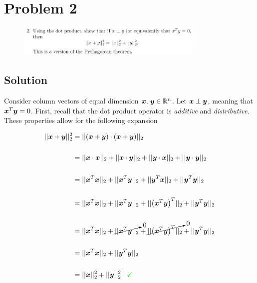 
\begingroup
\allowdisplaybreaks

\newpage
\section*{Problem 2}

\begin{figure}[h]
	\centering
	\includegraphics[width=0.8\textwidth]{./images/prob2_statement.png}
\end{figure}

\subsection*{Solution}

Consider column vectors of equal dimension $\boldsymbol{x},\,\boldsymbol{y} \in \mathbb{R}^{n}$. Let $\boldsymbol{x} \perp \boldsymbol{y}$, meaning that $\boldsymbol{x}^T \boldsymbol{y} = 0$. First, recall that the dot product operator is \textit{additive} and \textit{distributive}. These properties allow for the following expansion

\begin{align*}
	|| {\boldsymbol{x} + \boldsymbol{y}} ||_2^2 &= || {\left(\boldsymbol{x} + \boldsymbol{y}\right) \cdot \left(\boldsymbol{x} + \boldsymbol{y}\right)} ||_2 \\
	\\
	&= || {\boldsymbol{x} \cdot \boldsymbol{x}} ||_2 + || {\boldsymbol{x} \cdot \boldsymbol{y}} ||_2 + || {\boldsymbol{y} \cdot \boldsymbol{x}} ||_2 + || {\boldsymbol{y} \cdot \boldsymbol{y}} ||_2 \\
	\\
	&= || {\boldsymbol{x}^T\boldsymbol{x}} ||_2 + || {\boldsymbol{x}^T\boldsymbol{y}} ||_2 + || {\boldsymbol{y}^T\boldsymbol{x}} ||_2 + || {\boldsymbol{y}^T\boldsymbol{y}} ||_2 \\
	\\
	&= || {\boldsymbol{x}^T\boldsymbol{x}} ||_2 + || {\boldsymbol{x}^T\boldsymbol{y}} ||_2 + || {\left(\boldsymbol{x}^T\boldsymbol{y}\right)^T} ||_2 +|| {\boldsymbol{y}^T\boldsymbol{y}} ||_2 \\
	\\
	&= || {\boldsymbol{x}^T\boldsymbol{x}} ||_2 + \cancelto{0}{|| {\boldsymbol{x}^T\boldsymbol{y}} ||_2} + \cancelto{0}{|| {\left(\boldsymbol{x}^T\boldsymbol{y}\right)^T} ||_2} + || {\boldsymbol{y}^T\boldsymbol{y}} ||_2 \\
	\\
	&= || {\boldsymbol{x}^T\boldsymbol{x}} ||_2 + || {\boldsymbol{y}^T\boldsymbol{y}} ||_2 \\
	\\
	&= || {\boldsymbol{x}} ||_2^2 + || {\boldsymbol{y}} ||_2^2 \,\,\,\,\, \textcolor{green}{\checkmark}
\end{align*}